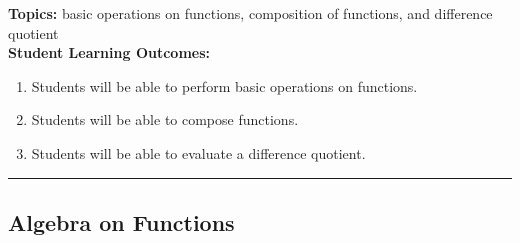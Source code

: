 
\noindent \textbf{Topics:}  basic operations on functions, composition of functions, and difference quotient\\

\noindent \textbf{Student Learning Outcomes:}
\begin{enumerate}
\item Students will be able to perform basic operations on functions.
\item Students will be able to compose functions.
\item Students will be able to evaluate a difference quotient.
\end{enumerate}

\hrule 

\bigskip

\subsection{Algebra on Functions}


